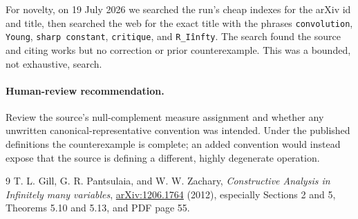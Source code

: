 \documentclass[11pt]{article}
\begin{document}
For novelty, on 19 July 2026 we searched the run's cheap indexes for the arXiv
id and title, then searched the web for the exact title with the phrases
\texttt{convolution}, \texttt{Young}, \texttt{sharp constant},
\texttt{critique}, and \texttt{R\_I\^infty}.  The search found the source and
citing works but no correction or prior counterexample.  This was a bounded,
not exhaustive, search.

\paragraph{Human-review recommendation.}
Review the source's null-complement measure assignment and whether any
unwritten canonical-representative convention was intended.  Under the
published definitions the counterexample is complete; an added convention
would instead expose that the source is defining a different, highly
degenerate operation.

\begin{thebibliography}{9}
T. L. Gill, G. R. Pantsulaia, and W. W. Zachary,
\emph{Constructive Analysis in Infinitely many variables},
\href{https://arxiv.org/abs/1206.1764}{arXiv:1206.1764} (2012),
especially Sections 2 and 5, Theorems 5.10 and 5.13, and PDF page 55.
\end{thebibliography}
\end{document}
